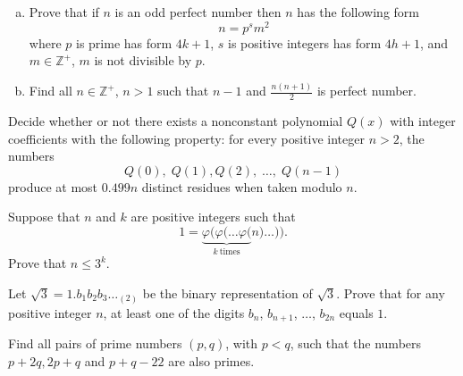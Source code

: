\documentclass[problems.tex]{subfile}
\begin{document}
	
	
	\begin{problem}[USAMO 2016]
		$ $
		\begin{enumerate}[(a)]
			\item Prove that if $n$ is an odd perfect number then $n$ has the following form \[ n=p^sm^2 \]where $p$ is prime has form $4k+1$, $s$ is positive integers has form $4h+1$, and $m\in\mathbb{Z}^+$, $m$ is not divisible by $p$.
			\item Find all $n\in\mathbb{Z}^+$, $n>1$ such that $n-1$ and $\frac{n(n+1)}{2}$ is perfect number.
		\end{enumerate}
	\end{problem}
	
	
	
	\begin{problem}
		Decide whether or not there exists a nonconstant polynomial $Q(x)$ with integer coefficients with the following property: for every positive integer $n > 2$, the numbers \[ Q(0), \; Q(1), Q(2), \; \dots, \; Q(n-1) \]produce at most $0.499n$ distinct residues when taken modulo $n$. %
	\end{problem}
	
	
	
	\begin{problem}
		Suppose that $n$ and $k$ are positive integers such that \[ 1 = \underbrace{\varphi( \varphi( \dots \varphi(}_{k\ \text{times}} n) \dots )). \]Prove that $n \le 3^k$. %
	\end{problem}
	
	
	\begin{problem}
		Let $\sqrt 3 = 1.b_1b_2b_3 \dots _{(2)}$ be the binary representation of $\sqrt 3$. Prove that for any positive integer $n$, at least one of the digits $b_n$, $b_{n+1}$, $\dots$, $b_{2n}$ equals $1$. %
	\end{problem}
	
	
	
	
	\begin{problem}
		Find all pairs of prime numbers $(p, q)$, with $p <q$, such that the numbers $p + 2q, 2p + q$ and $p + q - 22$ are also primes.
	\end{problem}
	
\end{document}
